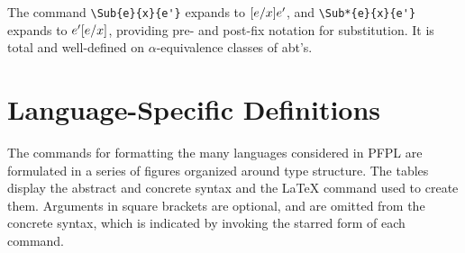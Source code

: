 \documentclass[11pt]{article}
\begin{document}
The command \verb|\Sub{e}{x}{e'}| expands to $\Sub{e}{x}{e'}$, and \verb|\Sub*{e}{x}{e'}| expands to $\Sub*{e}{x}{e'}$, providing pre- and post-fix notation for substitution.  It is total and well-defined on $\alpha$-equivalence classes of abt's.


\section*{Language-Specific Definitions}

The commands for formatting the many languages considered in \textsf{PFPL} are formulated in a series of figures organized around type structure.  The tables display the abstract and concrete syntax and the \LaTeX{} command used to create them.  Arguments in square brackets are optional, and are omitted from the concrete syntax, which is indicated by invoking the starred form of each command.

\clearpage
{}
\end{document}
